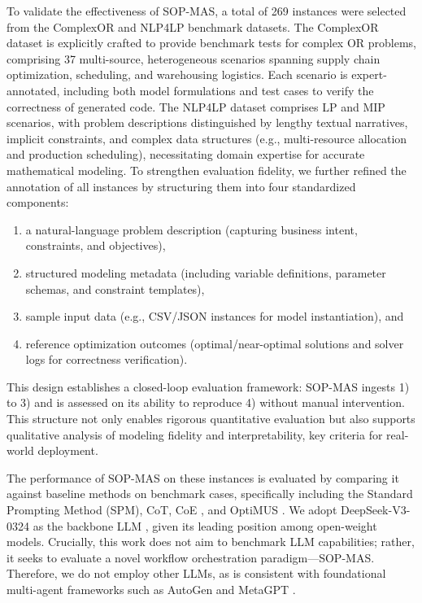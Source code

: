 \documentclass[preprint,12pt]{elsarticle}
\begin{document}
To validate the effectiveness of SOP-MAS, a total of 269 instances were selected from the ComplexOR and NLP4LP benchmark datasets. The ComplexOR dataset \citet{xiaoChainofExpertsWhenLLMs2023} is explicitly crafted to provide benchmark tests for complex OR problems, comprising 37 multi-source, heterogeneous scenarios spanning supply chain optimization, scheduling, and warehousing logistics. Each scenario is expert-annotated, including both model formulations and test cases to verify the correctness of generated code. The NLP4LP dataset comprises LP and MIP scenarios, with problem descriptions distinguished by lengthy textual narratives, implicit constraints, and complex data structures (e.g., multi-resource allocation and production scheduling), necessitating domain expertise for accurate mathematical modeling. To strengthen evaluation fidelity, we further refined the annotation of all instances by structuring them into four standardized components:
\begin{enumerate}[label=\arabic*)]
    \item a natural-language problem description (capturing business intent, constraints, and objectives),
    \item structured modeling metadata (including variable definitions, parameter schemas, and constraint templates),
    \item sample input data (e.g., CSV/JSON instances for model instantiation), and
    \item reference optimization outcomes (optimal/near-optimal solutions and solver logs for correctness verification).
\end{enumerate}
This design establishes a closed-loop evaluation framework: SOP-MAS ingests 1) to 3) and is assessed on its ability to reproduce 4) without manual intervention. This structure not only enables rigorous quantitative evaluation but also supports qualitative analysis of modeling fidelity and interpretability, key criteria for real-world deployment.

The performance of SOP-MAS on these instances is evaluated by comparing it against baseline methods on benchmark cases, specifically including the Standard Prompting Method (SPM), CoT, CoE \citep{xiaoChainofExpertsWhenLLMs2023}, and OptiMUS \citep{ahmaditeshniziOptiMUSScalableOptimization2024b}. We adopt DeepSeek-V3-0324 as the backbone LLM , given its leading position among open-weight models. Crucially, this work does not aim to benchmark LLM capabilities; rather, it seeks to evaluate a novel workflow orchestration paradigm—SOP-MAS. Therefore, we do not employ other LLMs, as is consistent with foundational multi-agent frameworks such as AutoGen \citep{wuAutoGenEnablingNextGen2024} and MetaGPT \citep{hongMetaGPTMetaProgramming2023a}. 
\end{document}
